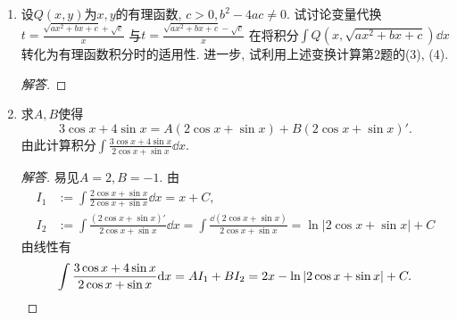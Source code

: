 \begin{4a}
\begin{enumerate}
\begin{proof}[解答]
\end{proof}
\item 设\(Q(x,y)\)为\(x,y\)的有理函数, \(c>0,b^2-4ac\ne 0\). 
试讨论变量代换\(t=\frac{\sqrt{ax^2+bx+c}+\sqrt{c}}{x}\)
与\(t=\frac{\sqrt{ax^2+bx+c}-\sqrt{c}}{x}\)
在将积分\(\int Q(x,\sqrt{ax^2+bx+c})\dd x\)转化为有理函数积分时的适用性. 
进一步, 试利用上述变换计算第2题的(3), (4).
\begin{proof}[解答]
	
\end{proof}
\item 求\(A,B\)使得\[3\cos x+4\sin x=A(2\cos x+\sin x)+B(2\cos x+\sin x)'.\]
由此计算积分\(\int\frac{3\cos x+4\sin x}{2\cos x+\sin x}\dd x.\)
\begin{proof}[解答]
易见\(A=2,B=-1\). 由\[\begin{aligned}
I_1&:=\int\frac{2\cos x+\sin x}{2\cos x+\sin x}\dd x=x+C,\\
I_2&:=\int\frac{(2\cos x+\sin x)'}{2\cos x+\sin x}\dd x
=\int\frac{\dd\left(2\cos x+\sin x\right)}{2\cos x+\sin x}
=\ln\left|2\cos x+\sin x\right|+C\end{aligned}\]
由线性有\[\int\frac{3\cos x+4\sin x}{2\cos x+\sin x}\mathrm{d} x
=AI_1+BI_2=2x-\ln\left|2\cos x+\sin x\right|+C.\qedhere\]
\end{proof}
\end{enumerate}
\end{4a}

